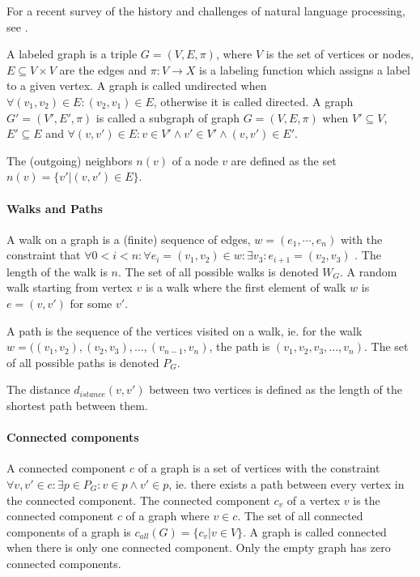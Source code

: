 For a recent survey of the history and challenges of natural language processing, see \cite{Chowdhury2003,DeCastilho2014}.

A labeled graph \cite[p.~1]{Bondy1976} is a triple $G = (V, E, \pi)$, where $V$ is the set of vertices or nodes, $E \subseteq V \times V$ are the edges and $\pi: V \to X$ is a labeling function which assigns a label to a given vertex. 
A graph is called undirected when $\forall (v_1, v_2) \in E: (v_2, v_1) \in E$, otherwise it is called directed. 
A graph $G'=(V', E', \pi)$ is called a subgraph of graph $G = (V, E, \pi)$ when $V' \subseteq V$, $E' \subseteq E$ and $\forall (v, v') \in E: v \in V' \land v' \in V' \land (v, v') \in E'$.

The (outgoing) neighbors $n(v)$ of a node $v$ are defined as the set $n(v) = \{v' | (v, v') \in E \}$.

\paragraph{Walks and Paths}
A walk on a graph is a (finite) sequence of edges, $w = (e_1, \cdots, e_n)$ with the constraint that $\forall 0 < i < n: \forall e_i = (v_1, v_2) \in w: \exists v_3: e_{i + 1} = (v_2, v_3)$ \cite{Vishwanathan2006}	. The length of the walk is $n$.
The set of all possible walks is denoted $W_G$.
A random walk \cite{Vishwanathan2006} starting from vertex $v$ is a walk where the first element of walk $w$ is $e = (v, v')$ for some $v'$.

A path is the sequence of the vertices visited on a walk, ie. for the walk $w = ((v_1, v_2), (v_2, v_3), \dots, (v_{n-1}, v_n)$, the path is $(v_1, v_2, v_3, \dots, v_n)$.
The set of all possible paths is denoted $P_G$.

The distance $d_{istance}(v, v')$ between two vertices is defined as the length of the shortest path between them.

\paragraph{Connected components}
A connected component $c$ of a graph is a set of vertices with the constraint $\forall v, v' \in c: \exists p \in P_G: v \in p \land v' \in p$, ie. there exists a path between every vertex in the connected component.
The connected component $c_v$ of a vertex $v$ is the connected component $c$ of a graph where $v \in c$.
The set of all connected components of a graph is $c_{all}(G) = \{ c_v | v \in V \}$. A graph is called connected when there is only one connected component. Only the empty graph has zero connected components.

